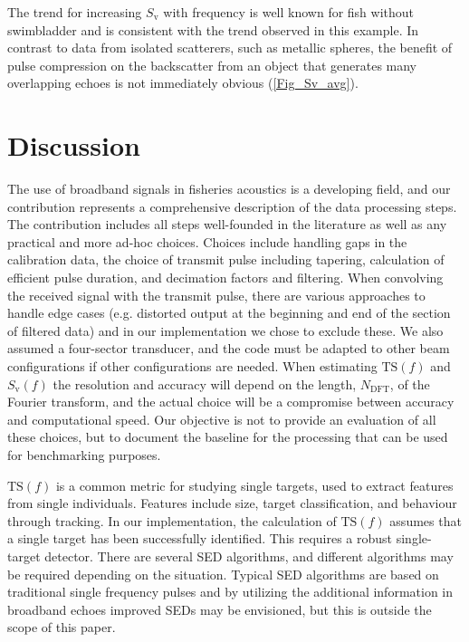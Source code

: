 \documentclass[preprint,12pt,TurnOnLineNumbers]{JASAnew}
\newcommand{\freqsym}{f}
\newcommand{\ts}{\textrm{TS}}
\newcommand{\sv}{S_{\textrm{v}}}
\newcommand{\ndft}{{N_{\textrm{DFT}}}}
\begin{document}
The trend for increasing $\sv$ with frequency is well known for fish without swimbladder \citep{korneliussen2010} and is consistent with the trend observed in this example. In contrast to data from isolated scatterers, such as metallic spheres, the benefit of pulse compression on the backscatter from an object that generates many overlapping echoes is not immediately obvious (\autoref{Fig_Sv_avg}).

\section{Discussion}

The use of broadband signals in fisheries acoustics is a developing field, and our contribution represents a comprehensive description of the data processing steps. The contribution includes all steps well-founded in the literature as well as any practical and more ad-hoc choices. Choices include handling gaps in the calibration data, the choice of transmit pulse including tapering, calculation of efficient pulse duration, and decimation factors and filtering. When convolving the received signal with the transmit pulse, there are various approaches to handle edge cases (e.g. distorted output at the beginning and end of the section of filtered data) and in our implementation we chose to exclude these. We also assumed a four-sector transducer, and the code must be adapted to other beam configurations if other configurations are needed. When estimating $\ts(\freqsym)$ and $\sv(\freqsym)$ the resolution and accuracy will depend on the length, $\ndft$, of the Fourier transform, and the actual choice will be a compromise between accuracy and computational speed. Our objective is not to provide an evaluation of all these choices, but to document the baseline for the processing that can be used for benchmarking purposes.

$\ts(\freqsym)$ is a common metric for studying single targets, used to extract features from single individuals. Features include size, target classification, and behaviour through tracking. In our implementation, the calculation of $\ts(\freqsym)$ assumes that a single target has been successfully identified. This requires a robust single-target detector. There are several SED algorithms, and different algorithms may be required depending on the situation. Typical SED algorithms are based on traditional single frequency pulses and by utilizing the additional information in broadband echoes improved SEDs may be envisioned, but this is outside the scope of this paper.
\end{document}
